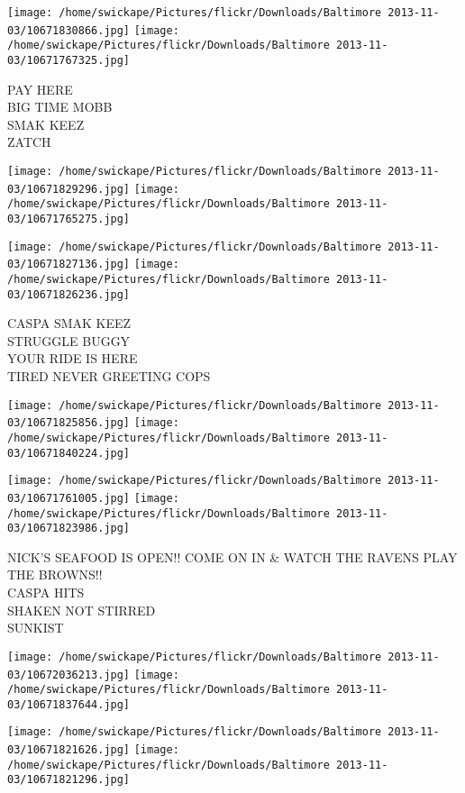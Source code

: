 \documentclass[10pt,letterpaper]{article}
\begin{document}
\texttt{[image: /home/swickape/Pictures/flickr/Downloads/Baltimore 2013-11-03/10671830866.jpg]}
\texttt{[image: /home/swickape/Pictures/flickr/Downloads/Baltimore 2013-11-03/10671767325.jpg]}

PAY HERE\\
BIG TIME MOBB\\
SMAK KEEZ\\
ZATCH
\pagebreak

\texttt{[image: /home/swickape/Pictures/flickr/Downloads/Baltimore 2013-11-03/10671829296.jpg]}
\texttt{[image: /home/swickape/Pictures/flickr/Downloads/Baltimore 2013-11-03/10671765275.jpg]}

\texttt{[image: /home/swickape/Pictures/flickr/Downloads/Baltimore 2013-11-03/10671827136.jpg]}
\texttt{[image: /home/swickape/Pictures/flickr/Downloads/Baltimore 2013-11-03/10671826236.jpg]}

CASPA SMAK KEEZ\\
STRUGGLE BUGGY\\
YOUR RIDE IS HERE\\
TIRED NEVER GREETING COPS
\pagebreak

\texttt{[image: /home/swickape/Pictures/flickr/Downloads/Baltimore 2013-11-03/10671825856.jpg]}
\texttt{[image: /home/swickape/Pictures/flickr/Downloads/Baltimore 2013-11-03/10671840224.jpg]}

\texttt{[image: /home/swickape/Pictures/flickr/Downloads/Baltimore 2013-11-03/10671761005.jpg]}
\texttt{[image: /home/swickape/Pictures/flickr/Downloads/Baltimore 2013-11-03/10671823986.jpg]}

NICK'S SEAFOOD IS OPEN!! COME ON IN \& WATCH THE RAVENS PLAY THE BROWNS!!\\
CASPA HITS\\
SHAKEN NOT STIRRED\\
SUNKIST
\pagebreak

\texttt{[image: /home/swickape/Pictures/flickr/Downloads/Baltimore 2013-11-03/10672036213.jpg]}
\texttt{[image: /home/swickape/Pictures/flickr/Downloads/Baltimore 2013-11-03/10671837644.jpg]}

\texttt{[image: /home/swickape/Pictures/flickr/Downloads/Baltimore 2013-11-03/10671821626.jpg]}
\texttt{[image: /home/swickape/Pictures/flickr/Downloads/Baltimore 2013-11-03/10671821296.jpg]}
\end{document}
